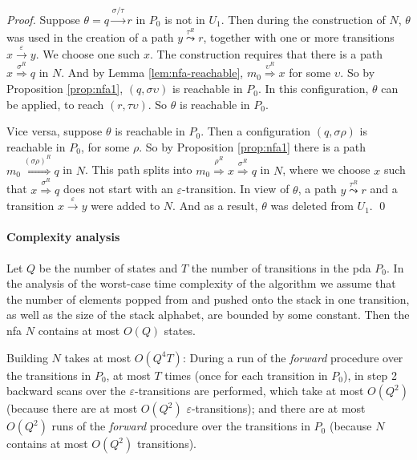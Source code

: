 \documentclass{llncs}
\newcommand{\eps}{\ensuremath{\varepsilon}}
\begin{document}
\begin{proof}
Suppose $\theta=q\stackrel{\sigma/\tau}{\rightarrow}r$ in $P_0$ is not in $U_1$. Then during the construction of $N$,
$\theta$ was used in the creation of a path $y\stackrel{\tau^R}{\leadsto}r$, together with one or more transitions
$x\stackrel{\eps}{\rightarrow}y$. We choose one such $x$. The construction requires that there is a path $x\stackrel{\sigma^R}{\Rightarrow}q$
in $N$. And by Lemma \ref{lem:nfa-reachable}, $m_0\stackrel{\upsilon^R}{\Rightarrow}x$ for some $\upsilon$. So by Proposition \ref{prop:nfa1},
$(q,\sigma\upsilon)$ is reachable in $P_0$. In this configuration, $\theta$ can be applied, to reach $(r,\tau\upsilon)$.
So $\theta$ is reachable in $P_0$.

Vice versa, suppose $\theta$ is reachable in $P_0$. Then a configuration $(q,\sigma\rho)$ is reachable in $P_0$, for some $\rho$.
So by Proposition \ref{prop:nfa1} there is a path $m_0\!\!\stackrel{(\sigma\rho)^R}{\Rightarrow}\!\!q$ in $N$.
This path splits into $m_0\stackrel{\rho^R}{\Rightarrow}x\stackrel{\sigma^R}{\Rightarrow}q$ in $N$, where we choose $x$ such that
$x\stackrel{\sigma^R}{\Rightarrow}q$ does not start with an $\eps$-transition.
In view of $\theta$, a path $y\stackrel{\tau^R}{\leadsto}r$ and a transition $x\stackrel{\eps}{\rightarrow}y$ were added to $N$.
And as a result, $\theta$ was deleted from $U_1$.
\qed
\end{proof}

\paragraph{Complexity analysis}
Let $Q$ be the number of states and $T$ the number of transitions in the pda $P_0$.
In the analysis of the worst-case time complexity of the algorithm we assume that the number of elements popped from and
pushed onto the stack in one transition, as well as the size of the stack alphabet, are bounded by some constant.
Then the nfa $N$ contains at most $O(Q)$ states.

Building $N$ takes at most $O(Q^4T)$: During a run of the {\em forward} procedure over the transitions in $P_0$,
at most $T$ times (once for each transition in $P_0$), in step 2 backward scans over the $\eps$-transitions are performed,
which take at most $O(Q^2)$ (because there are at most $O(Q^2)$ $\eps$-transitions);
and there are at most $O(Q^2)$ runs of the {\em forward} procedure over the transitions in $P_0$ (because $N$ contains at most $O(Q^2)$ transitions).
\end{document}
